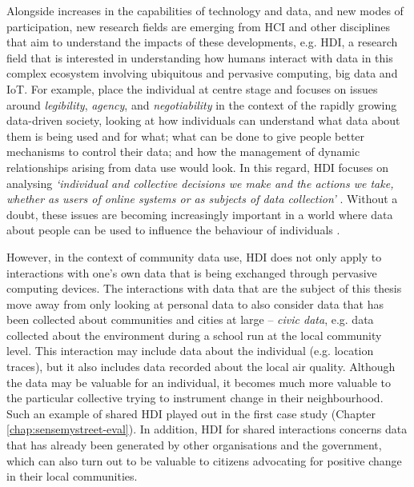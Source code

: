 Alongside increases in the capabilities of technology and data, and new modes of participation, new research fields are emerging from HCI and other disciplines that aim to understand the impacts of these developments, e.g. HDI, a research field that is interested in understanding how humans interact with data in this complex ecosystem involving ubiquitous and pervasive computing, big data and IoT. For example, \cite{mortier_human-data_2014} place the individual at centre stage and focuses on issues around \textit{legibility}, \textit{agency}, and \textit{negotiability} in the context of the rapidly growing data-driven society, looking at how individuals can understand what data about them is being used and for what; what can be done to give people better mechanisms to control their data; and how the management of dynamic relationships arising from data use would look. In this regard, HDI focuses on analysing \textit{`individual and collective decisions we make and the actions we take, whether as users of online systems or as subjects of data collection'} \citep{morton_community_2013}. Without a doubt, these issues are becoming increasingly important in a world where data about people can be used to influence the behaviour of individuals \citep{bond_61-million-person_2012}.

However, in the context of community data use, HDI does not only apply to interactions with one's own data that is being exchanged through pervasive computing devices. The interactions with data that are the subject of this thesis move away from only looking at personal data to also consider data that has been collected about communities and cities at large -- \textit{civic data}, e.g. data collected about the environment during a school run at the local community level. This interaction may include data about the individual (e.g. location traces), but it also includes data recorded about the local air quality. Although the data may be valuable for an individual, it becomes much more valuable to the particular collective trying to instrument change in their neighbourhood. Such an example of shared HDI played out in the first case study (Chapter \ref{chap:sensemystreet-eval}). In addition, HDI for shared interactions concerns data that has already been generated by other organisations and the government, which can also turn out to be valuable to citizens advocating for positive change in their local communities.

